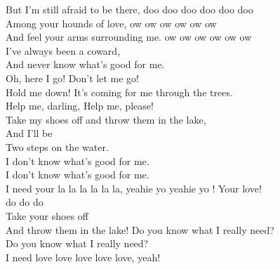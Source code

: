   But I'm still afraid to be there,
  doo doo doo doo doo doo\\
  Among your hounds of love,
  ow ow ow ow ow ow\\
  And feel your arms surrounding me.
  ow ow ow ow ow ow\\
  I've always been a coward,\\
  And never know what's good for me.\\
  Oh, here I go!
  Don't let me go!\\
  Hold me down!
  It's coming for me through the trees.\\
  Help me, darling,
  Help me, please!\\
  Take my shoes off
  and throw them in the lake,\\
  And I'll be\\
  Two steps on the water. \\
  I don't know what's good for me.\\
  I don't know what's good for me.\\
  I need your la la la la la la, yeahie yo yeahie yo !
  Your love!\\
  do do do\\
  Take your shoes off\\
  And throw them in the lake!
  Do you know what I really need?\\
  Do you know what I really need?\\
  I need love love love love love, yeah!\\
